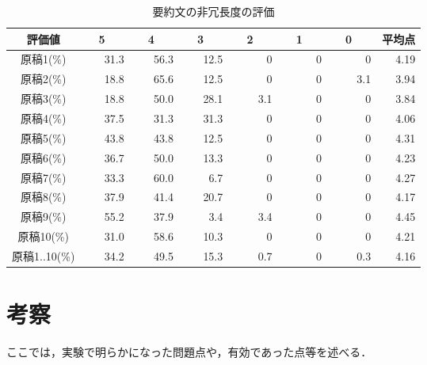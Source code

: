 \begin{table}[tbp]
 \begin{center}
  \caption{要約文の非冗長度の評価}
  \label{table:p_hijochodo}
  \begin{tabular}{|c||r|r|r|r|r|r||r|}\hline
   評価値    &\ \ 5\ \ \ 
             &\ \ 4\ \ \
             &\ \ 3\ \ \
             &\ \ 2\ \ \
             &\ \ 1\ \ \
             &\ \ 0\ \ \
             & 平均点 \\
   \hline \hline
   
   原稿1(\%) & 31.3 & 56.3 & 12.5 &    0 &    0 &    0 & 4.19 \\
   原稿2(\%) & 18.8 & 65.6 & 12.5 &    0 &    0 &  3.1 & 3.94 \\
   原稿3(\%) & 18.8 & 50.0 & 28.1 &  3.1 &    0 &    0 & 3.84 \\
   原稿4(\%) & 37.5 & 31.3 & 31.3 &    0 &    0 &    0 & 4.06 \\
   原稿5(\%) & 43.8 & 43.8 & 12.5 &    0 &    0 &    0 & 4.31 \\
   原稿6(\%) & 36.7 & 50.0 & 13.3 &    0 &    0 &    0 & 4.23 \\
   原稿7(\%) & 33.3 & 60.0 &  6.7 &    0 &    0 &    0 & 4.27 \\
   原稿8(\%) & 37.9 & 41.4 & 20.7 &    0 &    0 &    0 & 4.17 \\
   原稿9(\%) & 55.2 & 37.9 &  3.4 &  3.4 &    0 &    0 & 4.45 \\
   原稿10(\%)& 31.0 & 58.6 & 10.3 &    0 &    0 &    0 & 4.21 \\
   \hline
   原稿1..10(\%)
             & 34.2 & 49.5 & 15.3 &  0.7 &    0 &  0.3 & 4.16 \\
   \hline
  \end{tabular}
 \end{center}
\end{table}

\section{考察}
\label{section:observation}

ここでは，実験で明らかになった問題点や，有効であった点等を述べる．


